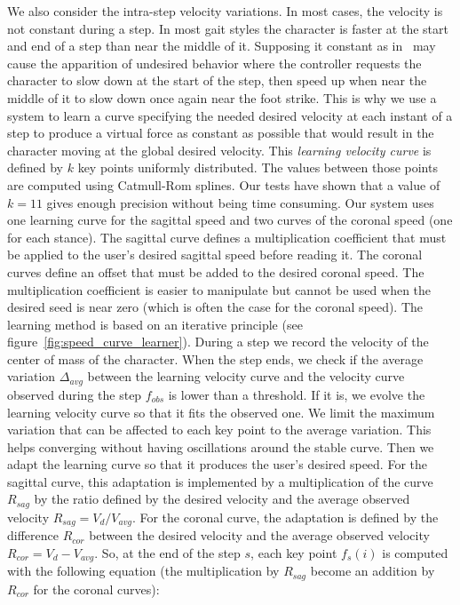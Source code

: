 \documentclass[conference]{acmsiggraph}
\begin{document}
We also consider the intra-step velocity variations. In most cases, the velocity is not constant during a step. In most gait styles the character is faster at the start and end of a step than near the middle of it. Supposing it constant as in~\cite{coros2010generalized} may cause the apparition of undesired behavior where the controller requests the character to slow down at the start of the step, then speed up when near the middle of it to slow down once again near the foot strike. This is why we use a system to learn a curve specifying the needed desired velocity at each instant of a step to produce a virtual force as constant as possible that would result in the character moving at the global desired velocity. This \textit{learning velocity curve} is defined by $k$ key points uniformly distributed. The values between those points are computed using Catmull-Rom splines. Our tests have shown that a value of $k=11$ gives enough precision without being time consuming. Our system uses one learning curve for the sagittal speed and two curves of the coronal speed (one for each stance). The sagittal curve defines a multiplication coefficient that must be applied to the user's desired sagittal speed before reading it. The coronal curves define an offset that must be added to the desired coronal speed. The multiplication coefficient is easier to manipulate but cannot be used when the desired seed is near zero (which is often the case for the coronal speed).
The learning method is based on an iterative principle (see figure~\ref{fig:speed_curve_learner}). During a step we record the velocity of the center of mass of the character. When the step ends, we check if the average variation $\Delta_{avg}$ between the learning velocity curve and the velocity curve observed during the step $f_{obs}$ is lower than a threshold. If it is, we evolve the learning velocity curve so that it fits the observed one. We limit the maximum variation that can be affected to each key point to the average variation. This helps converging without having oscillations around the stable curve. Then we adapt the learning curve so that it produces the user's desired speed. For the sagittal curve, this adaptation is implemented by a multiplication of the curve $R_{sag}$ by the ratio defined by the desired velocity and the average observed velocity $R_{sag}=V_d/V_{avg}$. For the coronal curve, the adaptation is defined by the difference $R_{cor}$ between the desired velocity and the average observed velocity $R_{cor}=V_d - V_{avg}$. So, at the end of the step $s$, each key point $f_s(i)$ is computed with the following equation (the multiplication by $R_{sag}$ become an addition by $R_{cor}$ for the coronal curves):
\end{document}
